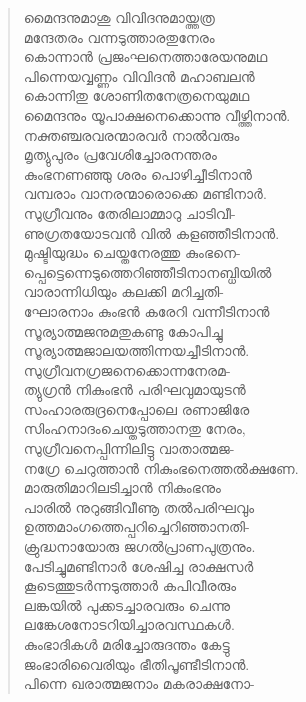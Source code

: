 \begin{verse}
മൈന്ദനുമാശു വിവിദനുമായ്ത്തത്ര\\
മന്ദേതരം വന്നടുത്താരതുനേരം\\
കൊന്നാന്‍ പ്രജംഘനെത്താരേയനുമഥ\\
പിന്നെയവ്വണ്ണം വിവിദന്‍ മഹാബലന്‍\\
കൊന്നിതു ശോണിതനേത്രനെയുമഥ\\
മൈന്ദനും യൂപാക്ഷനെക്കൊന്നു വീഴ്ത്തിനാന്‍.\\
നക്തഞ്ചരവരന്മാരവര്‍ നാല്‍വരും\\
മൃത്യുപുരം പ്രവേശിച്ചോരനന്തരം\\
കുംഭനണഞ്ഞു ശരം പൊഴിച്ചീടിനാന്‍\\
വമ്പരാം വാനരന്മാരൊക്കെ മണ്ടിനാര്‍.\\
സുഗ്രീവനും തേരിലാമ്മാറു ചാടിവീ-\\
ണുഗ്രതയോടവന്‍ വില്‍ കളഞ്ഞീടിനാന്‍.\\
മുഷ്ടിയുദ്ധം ചെയ്തനേരത്തു കുംഭനെ-\\
പ്പെട്ടെന്നെടുത്തെറിഞ്ഞീടിനാനബ്ധിയില്‍\\
വാരാന്നിധിയും കലക്കി മറിച്ചതി-\\
ഘോരനാം കുംഭന്‍ കരേറി വന്നീടിനാന്‍\\
സൂര്യാത്മജനുമതുകണ്ടു കോപിച്ചു\\
സൂര്യാത്മജാലയത്തിന്നയച്ചീടിനാന്‍.\\
സുഗ്രീവനഗ്രജനെക്കൊന്നനേരമ-\\
ത്യുഗ്രന്‍ നികുംഭന്‍ പരിഘവുമായുടന്‍\\
സംഹാരരുദ്രനെപ്പോലെ രണാജിരേ\\
സിംഹനാദംചെയ്തടുത്താനതു നേരം,\\
സുഗ്രീവനെപ്പിന്നിലിട്ടു വാതാത്മജ-\\
നഗ്രേ ചെറുത്താന്‍ നികുംഭനെത്തല്‍ക്ഷണേ.\\
മാരുതിമാറിലടിച്ചാന്‍ നികുംഭനും\\
പാരില്‍ നുറുങ്ങിവീണൂ തല്‍പരിഘവും\\
ഉത്തമാംഗത്തെപ്പറിച്ചെറിഞ്ഞാനതി-\\
ക്രുദ്ധനായോരു ജഗല്‍പ്രാണപുത്രനും.\\
പേടിച്ചുമണ്ടിനാര്‍ ശേഷിച്ച രാക്ഷസര്‍\\
കൂടെത്തുടര്‍ന്നടുത്താര്‍ കപിവീരരും\\
ലങ്കയില്‍ പുക്കടച്ചാരവരും ചെന്നു\\
ലങ്കേശനോടറിയിച്ചാരവസ്ഥകള്‍.\\
കുംഭാദികള്‍ മരിച്ചോരുദന്തം കേട്ടു\\
ജംഭാരിവൈരിയും ഭീതിപൂണ്ടീടിനാന്‍.\\
പിന്നെ ഖരാത്മജനാം മകരാക്ഷനോ-\\

\end{verse}
